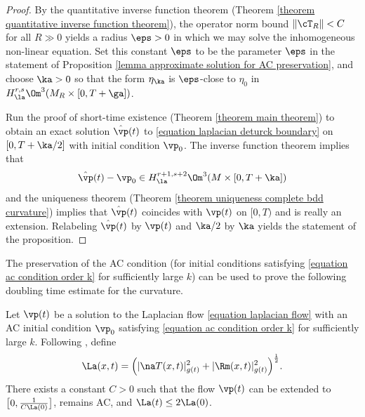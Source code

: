\documentclass[hidelinks, 12pt, oneside, reqno]{amsart}
\begin{document}
\begin{proof}
By the quantitative inverse function theorem (Theorem \ref{theorem quantitative inverse function theorem}), the operator norm bound $\|\cT_R\| < C$ for all $R \gg 0$ yields a radius $\eps > 0$ in which we may solve the inhomogeneous non-linear equation. Set this constant $\eps$ to be the parameter $\eps$ in the statement of Proposition \ref{lemma approximate solution for AC preservation}, and choose $\ka > 0$ so that the form $\eta_\ka$ is $\eps$-close to $\eta_0$ in $H^{r, s}_\la \Om^3 (M_R \times [0,T+\ga])$. 

Run the proof of short-time existence (Theorem \ref{theorem main theorem}) to obtain an exact solution $\hat \vp(t)$ to \eqref{equation laplacian deturck boundary} on $[0, T + \ka /2]$ with initial condition $\vp_0$. The inverse function theorem implies that \[
\hat \vp(t) - \vp_0 \in H^{r+1, s+2}_{\la} \Om^3(M \times [0,T + \ka])
\]
and the uniqueness theorem (Theorem \ref{theorem uniqueness complete bdd curvature}) implies that $\hat \vp(t)$ coincides with $\vp(t)$ on $[0,T)$ and is really an extension. Relabeling $\hat \vp(t)$ by $\vp(t)$ and $\ka/2$ by $\ka$ yields the statement of the proposition. 
\end{proof}

The preservation of the AC condition (for initial conditions satisfying \eqref{equation ac condition order k} for sufficiently large $k$) can be used to prove the following doubling time estimate for the curvature.

\begin{cor}\label{corollary doubling time estimate}
Let $\vp(t)$ be a solution to the Laplacian flow \eqref{equation laplacian flow} with an AC initial condition $\vp_0$ satisfying \eqref{equation ac condition order k} for sufficiently large $k$. Following \cite{LotayWeiLaplacianFlow}, define 
\[
\La(x,t) = \Big( |\na T(x,t)|^2_{g(t)} + |\Rm(x,t)|^2_{g(t)} \Big)^\frac12.
\]
There exists a constant $C > 0$ such that the flow $\vp(t)$ can be extended to $\big[0, \tfrac{1}{C\La(0)} \big]$, remains AC, and $\La(t) \le 2\La(0)$.
\end{cor}
\end{document}
